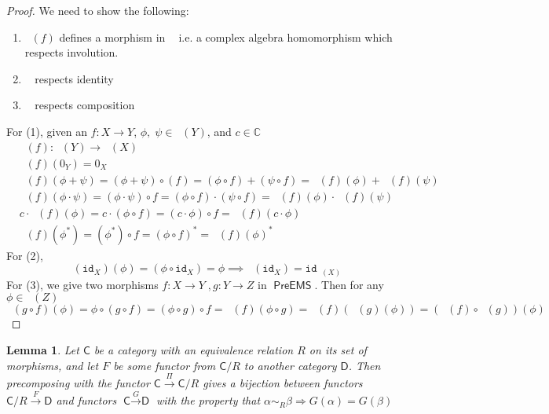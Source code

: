 \documentclass{article}
\newcommand{\C}{\mathbb{C}}
\newtheorem{lemma}[subsection]{Lemma}
\DeclareMathOperator{\calg}{\textsf{CAlg}^{*}_{\mathbb{C}}}
\DeclareMathOperator{\linf}{L^\infty}
\DeclareMathOperator{\preems}{\textsf{PreEMS}}
\begin{document}
\begin{proof} We need to show the following:
\begin{enumerate}
	\item $\linf(f)$ defines a morphism in $\calg$ i.e. a complex algebra homomorphism which respects involution.
	\item $\linf$ respects identity
	\item $\linf$ respects composition
\end{enumerate}
For (1), given an $f: X\rightarrow{Y}$, $\phi,\;\psi\in\linf(Y)$, and $c\in\C$
\begin{equation}
\begin{split}
	&\linf(f) : \linf(Y)\rightarrow{}\linf(X)\\
	&\linf(f)(0_Y) = 0_X\\
	&\linf(f)(\phi+\psi) = (\phi+\psi)\circ(f) = (\phi\circ{f}) + (\psi\circ{f}) = \linf(f) (\phi) + \linf(f)(\psi)\\
	&\linf(f)(\phi\cdot\psi) = (\phi\cdot\psi)\circ{f} = (\phi\circ{f})\cdot(\psi\circ{f}) = \linf(f)(\phi)\cdot\linf(f)(\psi)\\
	&c\cdot\linf(f)(\phi) = c\cdot(\phi\circ{f}) = (c\cdot\phi)\circ{f} = \linf(f)(c\cdot\phi)\\
	&\linf(f)(\phi^*) = (\phi^*)\circ{f} = (\phi\circ{f})^* = \linf(f)(\phi)^*
\end{split}
\end{equation}
For (2),
\begin{equation}
	\linf(\texttt{id}_X)(\phi) = (\phi\circ\texttt{id}_X) = \phi \implies \linf(\texttt{id}_X) = \texttt{id}_{\linf(X)} 
\end{equation}
For (3), we give two morphisms $f: X\rightarrow Y\;,g:Y\rightarrow Z$ in $\preems$.  Then for any $\phi\in\linf(Z)$
\begin{equation}
	\linf(g\circ{}f)(\phi) = \phi\circ(g\circ{f}) = (\phi\circ{g})\circ{f} = \linf(f)(\phi\circ{g}) = \linf(f)(\linf(g)(\phi)) = (\linf(f)\circ{}\linf(g))(\phi)
\end{equation}
\end{proof}
\begin{lemma}
	Let $\textsf{C}$ be a category with an equivalence relation $R$ on its set of morphisms, and let $F$ be some functor from $\textsf{C}/R$ to another category $\textsf{D}$.  Then precomposing with the functor $\textsf{C}\xrightarrow{\Pi}\textsf{C}/R$ gives a bijection between functors $\textsf{C}/R\xrightarrow{F}\textsf{D}$ and functors $\textsf{C}\xrightarrow{G}\textsf{D}$ with the property that $\alpha\sim_R\beta\Rightarrow{}G(\alpha) = G(\beta)$
\end{lemma}
\end{document}
